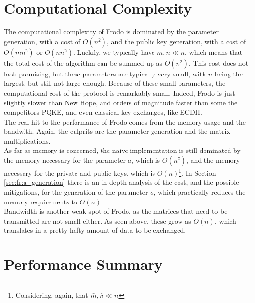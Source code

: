 \section{Computational Complexity}
The computational complexity of Frodo is dominated by the parameter generation, with a cost of $O(n^2)$, and the public key generation, with a cost of $O(\bar{m}n^2)$ or $O(\bar{n}n^2)$. Luckily, we typically have $\bar{m},\bar{n} \ll n$, which means that the total cost of the algorithm can be summed up as $O(n^2)$. This cost does not look promising, but these parameters are typically very small, with $n$ being the largest, but still not large enough. Because of these small parameters, the computational cost of the protocol is remarkably small. Indeed, Frodo is just slightly slower than New Hope, and orders of magnitude faster than some the competitors PQKE, and even classical key exchanges, like ECDH.\\
The real hit to the performance of Frodo comes from the memory usage and the bandwith. Again, the culprits are the parameter generation and the matrix multiplications.\\
As far as memory is concerned, the naive implementation is still dominated by the memory necessary for the parameter $a$, which is $O(n^2)$, and the memory necessary for the private and public keys, which is $O(n)$\footnote{Considering, again, that $\bar{m},\bar{n} \ll n$}. In Section \ref{sec:fr:a_generation} there is an in-depth analysis of the cost, and the possible mitigations, for the generation of the parameter $a$, which practically reduces the memory requirements to $O(n)$.\\
Bandwidth is another weak spot of Frodo, as the matrices that need to be transmitted are not small either. As seen above, these grow as $O(n)$, which translates in a pretty hefty amount of data to be exchanged.\\

\section{Performance Summary}

